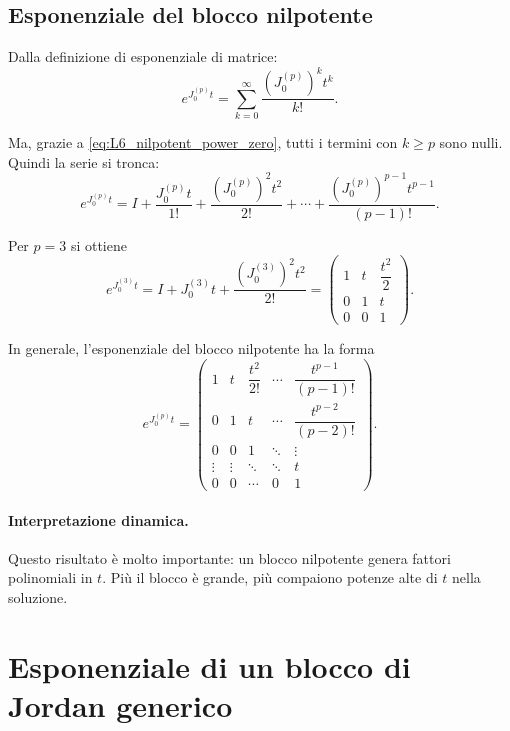 \subsection{Esponenziale del blocco nilpotente}

Dalla definizione di esponenziale di matrice:
\[
e^{J_0^{(p)}t}
=
\sum_{k=0}^{\infty}\frac{\left(J_0^{(p)}\right)^k t^k}{k!}.
\]

Ma, grazie a \eqref{eq:L6_nilpotent_power_zero}, tutti i termini con $k\ge p$ sono nulli. Quindi la serie si tronca:
\begin{equation}
e^{J_0^{(p)}t}
=
I+\frac{J_0^{(p)}t}{1!}+\frac{\left(J_0^{(p)}\right)^2 t^2}{2!}+\cdots+\frac{\left(J_0^{(p)}\right)^{p-1} t^{p-1}}{(p-1)!}.
\label{eq:L6_exp_nilpotent_jordan}
\end{equation}

Per $p=3$ si ottiene
\[
e^{J_0^{(3)}t}
=
I+J_0^{(3)}t+\frac{\left(J_0^{(3)}\right)^2t^2}{2!}
=
\begin{pmatrix}
1 & t & \dfrac{t^2}{2}\\
0 & 1 & t\\
0 & 0 & 1
\end{pmatrix}.
\]

In generale, l'esponenziale del blocco nilpotente ha la forma
\begin{equation}
e^{J_0^{(p)}t}
=
\begin{pmatrix}
1 & t & \dfrac{t^2}{2!} & \cdots & \dfrac{t^{p-1}}{(p-1)!}\\
0 & 1 & t & \cdots & \dfrac{t^{p-2}}{(p-2)!}\\
0 & 0 & 1 & \ddots & \vdots\\
\vdots & \vdots & \ddots & \ddots & t\\
0 & 0 & \cdots & 0 & 1
\end{pmatrix}.
\label{eq:L6_exp_nilpotent_general}
\end{equation}

\paragraph{Interpretazione dinamica.}
Questo risultato è molto importante: un blocco nilpotente genera fattori polinomiali in $t$.  
Più il blocco è grande, più compaiono potenze alte di $t$ nella soluzione.

\section{Esponenziale di un blocco di Jordan generico}

